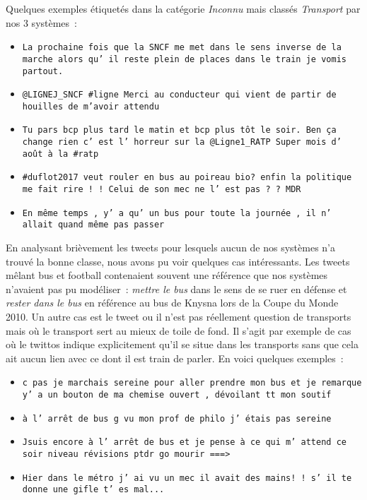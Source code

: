 Quelques exemples étiquetés dans la catégorie \emph{Inconnu} mais classés \emph{Transport} par nos 3 systèmes~:
\begin{itemize}
\item \texttt{La prochaine fois que la SNCF me met dans le sens inverse de la marche alors qu' il reste plein de places dans le train je vomis partout.}
\item \texttt{@LIGNEJ\_SNCF \#ligne Merci au conducteur qui vient de partir de houilles de m'avoir attendu}
\item \texttt{Tu pars bcp plus tard le matin et bcp plus tôt le soir. Ben ça change rien c' est l' horreur sur la @Ligne1\_RATP Super mois d' août à la \#ratp}
\item \texttt{\#duflot2017  veut rouler en bus au poireau bio?  enfin la politique me fait rire ! ! Celui de son mec ne l' est pas ? ? MDR}
\item \texttt{En même temps , y' a qu' un bus pour toute la journée , il n' allait quand même pas passer}
\end{itemize}

En analysant brièvement les tweets pour lesquels aucun de nos systèmes n'a trouvé la bonne classe, nous avons pu voir quelques cas intéressants.
Les tweets mêlant bus et football contenaient souvent une référence que nos systèmes n'avaient pas pu modéliser~: \emph{mettre le bus} dans le sens de se ruer en défense et \emph{rester dans le bus} en référence au bus de Knysna lors de la Coupe du Monde 2010.
Un autre cas est le tweet ou il n'est pas réellement question de transports mais où le transport sert au mieux de toile de fond.
Il s'agit par exemple de cas où le twittos indique explicitement qu'il se situe dans les transports sans que cela ait aucun lien avec ce dont il est train de parler. En voici quelques exemples~:

\begin{itemize}
\item \texttt{c pas je marchais sereine pour aller prendre mon bus et je remarque y' a un bouton de ma chemise ouvert , dévoilant tt mon soutif}
\item \texttt{à l' arrêt de bus g vu mon prof de philo j' étais pas sereine}
\item \texttt{Jsuis encore à l' arrêt de bus et je pense à ce qui m' attend ce soir niveau révisions ptdr go mourir ===>}
\item \texttt{Hier dans le métro j' ai vu un mec il avait des mains! ! s' il te donne une gifle t' es mal...}
\end{itemize}

